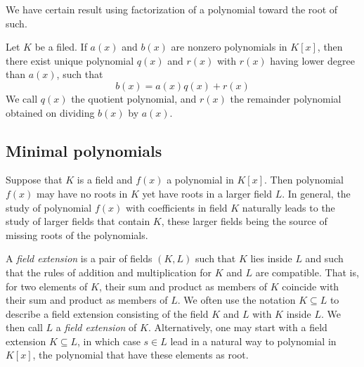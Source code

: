 We have certain result using factorization of a polynomial toward the root of such. 
\begin{theorem}
    Let $K$ be a filed. If $a(x)$ and $b(x)$ are nonzero polynomials in $K[x]$, then there exist unique polynomial $q(x)$ and $r(x)$ with $r(x)$ having lower degree than $a(x)$, such that 
    \begin{equation}
        b(x) = a(x)q(x) + r(x)
    \end{equation}
    We call $q(x)$ the quotient polynomial, and $r(x)$ the remainder polynomial obtained on dividing $b(x)$ by $a(x)$. 
\end{theorem}

\subsection{Minimal polynomials}

Suppose that $K$ is a field and $f(x)$ a polynomial in $K[x]$. Then polynomial $f(x)$ may have no roots in $K$ yet have roots in a larger field $L$. In general, the study of polynomial $f(x)$ with coefficients in field $K$ naturally leads to the study of larger fields that contain $K$, these larger fields being the source of missing roots of the polynomials. 

A \textit{field extension} is a pair of fields $(K,L)$ such that $K$ lies inside $L$ and such that the rules of addition and multiplication for $K$ and $L$ are compatible. That is, for two elements of $K$, their sum and product as members of $K$ coincide with their sum and product as members of $L$. We often use the notation $K\subseteq L$ to describe a field extension consisting of the field $K$ and $L$ with $K$ inside $L$. We then call $L$ a \textit{field extension} of $K$. Alternatively, one may start with a field extension $K\subseteq L$, in which case $s\in L$ lead in a natural way to polynomial in $K[x]$, the polynomial that have these elements as root. 

